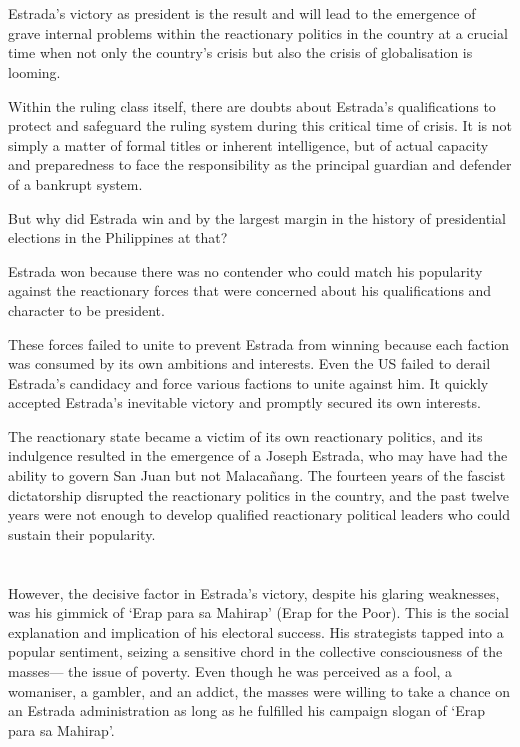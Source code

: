 \section{}
Estrada's victory as president is the result and will lead to the emergence 
of grave internal problems within the reactionary politics in the country 
at a crucial time when not only the country's crisis but also the crisis 
of globalisation is looming.

Within the ruling class itself, there are doubts about Estrada's qualifications 
to protect and safeguard the ruling system during this critical time of crisis. 
It is not simply a matter of formal titles or inherent intelligence, 
but of actual capacity and preparedness to face the responsibility as 
the principal guardian and defender of a bankrupt system.

But why did Estrada win and by the largest margin in the history of 
presidential elections in the Philippines at that?

Estrada won because there was no contender who could match his popularity 
against the reactionary forces that were concerned about his qualifications 
and character to be president.

These forces failed to unite to prevent Estrada from winning because each 
faction was consumed by its own ambitions and interests. Even the US failed 
to derail Estrada's candidacy and force various factions to unite against him. 
It quickly accepted Estrada's inevitable victory and promptly secured its
own interests.

The reactionary state became a victim of its own reactionary politics, 
and its indulgence resulted in the emergence of a Joseph Estrada, who may 
have had the ability to govern San Juan but not Malacañang. 
The fourteen years of the fascist dictatorship disrupted the 
reactionary politics in the country, 
and the past twelve years were not enough to develop qualified 
reactionary political leaders who could sustain their popularity.


\section{}
However, the decisive factor in Estrada's victory, 
despite his glaring weaknesses, was his gimmick of 
`Erap para sa Mahirap' (Erap for the Poor). 
This is the social explanation and implication of his electoral success. 
His strategists tapped into a popular sentiment, 
seizing a sensitive chord in the collective consciousness of the masses---%
the issue of poverty. 
Even though he was perceived as a fool, a womaniser, a gambler, and an addict, 
the masses were willing to take a chance on an Estrada administration 
as long as he fulfilled his campaign slogan of `Erap para sa Mahirap'.

